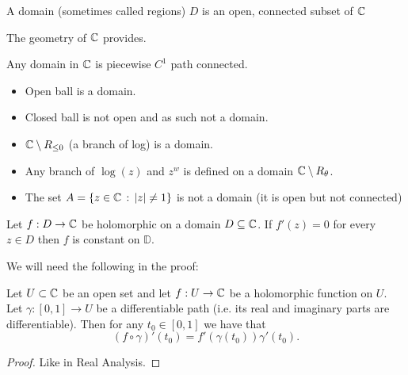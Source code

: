 \documentclass[10pt, a4paper]{article}
\begin{document}
\begin{definition}[Domains]
    A domain
    (sometimes called regions)
    $D$ is an open,
    connected subset of $\mathbb{C}$
\end{definition}

The geometry of $\mathbb{C}$ provides.

\begin{theorem}
    Any domain in $\mathbb{C}$ is piecewise $C ^ 1$ path connected.
\end{theorem}

\begin{example}\phantom{}
    \begin{itemize}
        \item Open ball is a domain.

        \item Closed ball is not open and as such not a domain.

        \item $\mathbb{C} \setminus R_{\leq 0}$
        (a branch of log)
        is a domain.

        \item Any branch of $\log(z)$ and $z ^ {w}$ is defined on a domain $\mathbb{C} \setminus R_{\theta}$.

        \item The set $A = \{z \in \mathbb{C}\,:\, |z| \neq 1\}$ is not a domain
        (it is open but not connected)
    \end{itemize}
\end{example}

\begin{theorem}\label{companalyII:thm:zerodivthm}
    Let $f : D \to \mathbb{C}$ be holomorphic on a domain $D \subseteq \mathbb{C}$.
    If $f'(z) = 0$ for every $z \in D$ then $f$ is constant on $\mathbb{D}$.
\end{theorem}

We will need the following in the proof:
\begin{lemma}
    Let $U \subset \mathbb{C}$ be an open set and let $f : U \to \mathbb{C}$ be a holomorphic function on $U$.
    Let $\gamma : [0, 1] \to U$ be a differentiable path
    (i.e. its real and imaginary parts are differentiable).
    Then for any $t_0 \in [0, 1]$ we have that
    \[
    (f \circ \gamma)'(t_0) = f'(\gamma(t_0))\gamma'(t_0).
    \]

    \begin{proof}
        Like in Real Analysis.
    \end{proof}
\end{lemma}
\end{document}
